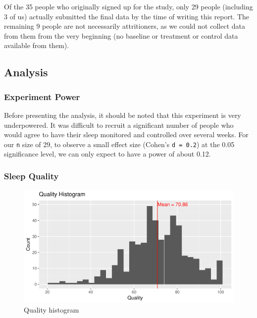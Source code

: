 \documentclass[12pt,]{article}
\begin{document}
Of the 35 people who originally signed up for the study, only 29 people
(including 3 of us) actually submitted the final data by the time of
writing this report. The remaining 9 people are not necessarily
attritioners, as we could not collect data from them from the very
beginning (no baseline or treatment or control data available from
them).

\hypertarget{analysis}{%
\subsection{Analysis}\label{analysis}}

\hypertarget{experiment-power}{%
\subsubsection{Experiment Power}\label{experiment-power}}

Before presenting the analysis, it should be noted that this experiment
is very underpowered. It was difficult to recruit a significant number
of people who would agree to have their sleep monitored and controlled
over several weeks. For our \texttt{n} size of 29, to observe a small
effect size (Cohen's \texttt{d\ =\ 0.2}) at the 0.05 significance level,
we can only expect to have a power of about 0.12.

\hypertarget{sleep-quality}{%
\subsubsection{Sleep Quality}\label{sleep-quality}}

\begin{figure}
\centering
\includegraphics{report_files/figure-latex/quality_histogram-1.pdf}
\caption{\label{fig:quality_histogram} Quality histogram}
\end{figure}
\end{document}
